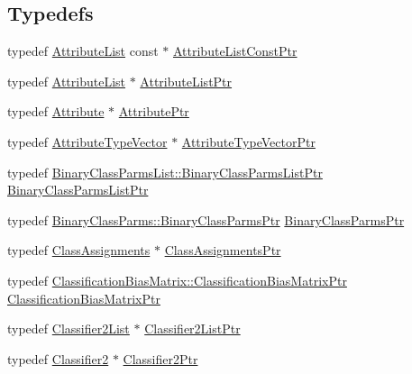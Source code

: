 \subsection*{Typedefs}
\begin{DoxyCompactItemize}
\item 
typedef \hyperlink{class_k_k_m_l_l_1_1_attribute_list}{Attribute\+List} const $\ast$ \hyperlink{namespace_k_k_m_l_l_af9190c2912dde392be82b360d6f82e2d}{Attribute\+List\+Const\+Ptr}
\item 
typedef \hyperlink{class_k_k_m_l_l_1_1_attribute_list}{Attribute\+List} $\ast$ \hyperlink{namespace_k_k_m_l_l_a93de627a8628c403dc343b353b8b4a42}{Attribute\+List\+Ptr}
\item 
typedef \hyperlink{class_k_k_m_l_l_1_1_attribute}{Attribute} $\ast$ \hyperlink{namespace_k_k_m_l_l_a7bf3ea66cacd9dddc58369800cbc93b6}{Attribute\+Ptr}
\item 
typedef \hyperlink{class_k_k_m_l_l_1_1_attribute_type_vector}{Attribute\+Type\+Vector} $\ast$ \hyperlink{namespace_k_k_m_l_l_aaac261e37ef0685bf17b486fd0498aa9}{Attribute\+Type\+Vector\+Ptr}
\item 
typedef \hyperlink{class_k_k_m_l_l_1_1_binary_class_parms_list_acdd9df4b1cfdbd470a7937a935b8eef6}{Binary\+Class\+Parms\+List\+::\+Binary\+Class\+Parms\+List\+Ptr} \hyperlink{namespace_k_k_m_l_l_a15376316ebec0ec5e4d1f11cfb06c15b}{Binary\+Class\+Parms\+List\+Ptr}
\item 
typedef \hyperlink{class_k_k_m_l_l_1_1_binary_class_parms_a97baab4d7e51018b31648a2f5a36a988}{Binary\+Class\+Parms\+::\+Binary\+Class\+Parms\+Ptr} \hyperlink{namespace_k_k_m_l_l_aca399c0744e11553270ffaca507cfee7}{Binary\+Class\+Parms\+Ptr}
\item 
typedef \hyperlink{class_k_k_m_l_l_1_1_class_assignments}{Class\+Assignments} $\ast$ \hyperlink{namespace_k_k_m_l_l_ae085749533329dd0fe12b6221ad79b03}{Class\+Assignments\+Ptr}
\item 
typedef \hyperlink{class_k_k_m_l_l_1_1_classification_bias_matrix_a62b9ebf8fa4f7669dec9248876945bff}{Classification\+Bias\+Matrix\+::\+Classification\+Bias\+Matrix\+Ptr} \hyperlink{namespace_k_k_m_l_l_a547d5168c662f2379d406e8deb194f39}{Classification\+Bias\+Matrix\+Ptr}
\item 
typedef \hyperlink{class_k_k_m_l_l_1_1_classifier2_list}{Classifier2\+List} $\ast$ \hyperlink{namespace_k_k_m_l_l_a8ec551ed7084d7a34afeff539e76f399}{Classifier2\+List\+Ptr}
\item 
typedef \hyperlink{class_k_k_m_l_l_1_1_classifier2}{Classifier2} $\ast$ \hyperlink{namespace_k_k_m_l_l_ae49327d641e08f01c40df84678fad11e}{Classifier2\+Ptr}

\end{DoxyCompactItemize}
